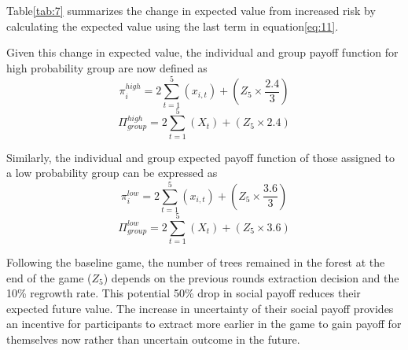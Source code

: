  Table\ref{tab:7} summarizes the change in expected value from increased risk by calculating the expected value using the last term in equation\ref{eq:11}.




\noindent Given this change in expected value, the individual and group payoff function for high probability group are now defined as
\begin{equation}
\label{eq:4}
    \pi_{i}^{high}=2\sum_{t=1}^{5} (x_{i,t})+ \left( Z_{5} \times \frac{2.4}{3} \right)
\end{equation}
\begin{equation}
\label{eq:5}
    \Pi_{group}^{high}=2\sum_{t=1}^{5} (X_{t})+ \left( Z_{5} \times {2.4} \right)
\end{equation}

\noindent Similarly, the individual and group expected payoff function of those assigned to a low probability group can be expressed as
\begin{equation}
\label{eq:6}
    \pi_{i}^{low}=2\sum_{t=1}^{5} (x_{i,t})+ \left( Z_{5} \times \frac{3.6}{3} \right)
\end{equation}
\begin{equation}
\label{eq:7}
    \Pi_{group}^{low}=2\sum_{t=1}^{5} (X_{t})+ \left( Z_{5} \times {3.6} \right)
\end{equation}

 Following the baseline game, the number of trees remained in the forest at the end of the game ($Z_{5}$) depends on the previous rounds extraction decision and the 10\% regrowth rate. This potential 50\% drop in social payoff reduces their expected future value. The increase in uncertainty of their social payoff provides an incentive for participants to extract more earlier in the game to gain payoff for themselves now rather than uncertain outcome in the future.
